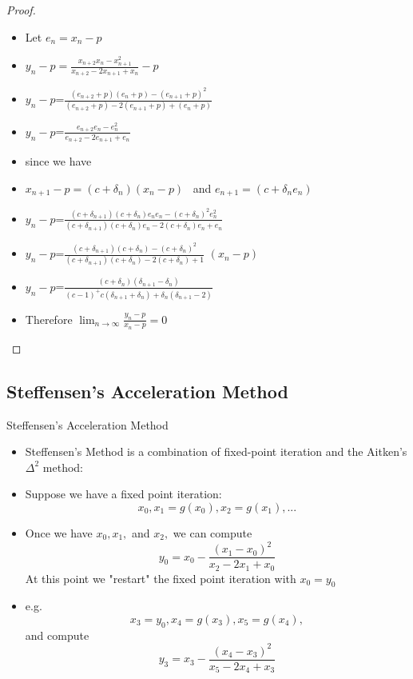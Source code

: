 \documentclass{beamer}
\begin{document}
\begin{frame}
\begin{proof}
\begin{itemize}
	\item[]<1-> Let $e_{n} = x_{n}-p$ 
	\item[]<2-> $y_{n}-p=\frac{x_{n+2}x_{n}-x_{n+1}^2}{x_{n+2} - 2x_{n+1}+x_{n}}-p$
	\item[]<3-> $y_{n}-p$=$\frac{(e_{n+2}+p)(e_{n}+p)-(e_{n+1}+p)^2}{(e_{n+2}+p)-2(e_{n+1}+p)+(e_{n}+p)}$
	\item[]<4-> $y_{n}-p$=$\frac{e_{n+2}e_{n}-e_{n}^2}{e_{n+2}-2e_{n+1}+e_{n}}$
	\item[]<5-> since we have
	\item[]<5-> $x_{n+1}-p= (c+\delta_{n})(x_{n}-p)$ 
	\ and $e_{n+1}=(c+\delta_{n}e_{n})$
	\item[]<6-> $y_{n}-p$=$\frac{(c+\delta_{n+1})(c+\delta_{n})e_{n}e_{n}-(c+\delta_{n})^2e_{n}^2}{(c+\delta_{n+1})(c+\delta_{n})e_{n}-2(c+\delta_{n})e_{n}+e_{n}}$
	\item[]<7-> $y_{n}-p$=$\frac{(c+\delta_{n+1})(c+\delta_{n})-(c+\delta_{n})^2}{(c+\delta_{n+1})(c+\delta_{n})-2(c+\delta_{n})+1}$ $(x_{n}-p)$
	\item[]<8-> $y_{n}-p$=$\frac{(c+\delta_{n})(\delta_{n+1}-\delta_{n})}{(c-1)^+c(\delta_{n+1}+\delta_{n})+\delta_{n}(\delta_{n+1}-2)}$
	\item[]<9-> Therefore $\lim_{n\rightarrow\infty} \frac{y_{n}-p}{x_{n}-p}=0$
\end{itemize}
\end{proof}

\end{frame}
\subsection{Steffensen's Acceleration Method}
\begin{frame}
\begin{block}{Steffensen's Acceleration Method}
\begin{itemize}



\item[]<1->Steffensen’s Method is a combination of fixed-point iteration and the Aitken’s $\Delta^2$ method: 

	\item[]<2->Suppose we have a fixed point iteration: $$x_0,x_1=g(x_0),x_2=g(x_1),...$$
	\item[]<3->Once we have $x_0, x_1,$ and $x_2,$ we can compute $$ y_0=x_0-\frac{(x_1-x_0)^2}{x_2-2x_1+x_0}$$ 
At this point we "restart" the fixed point iteration with $x_0=y_0$
	\item[]<4->e.g.\color{brown} $$x_3=y_0, x_4=g(x_3), x_5=g(x_4),$$\color{black}
and compute \color{brown} $$y_3=x_3-\frac{(x_4-x_3)^2}{x_5-2x_4+x_3}$$ \color{black}

\end{itemize}

\end{block}
\end{frame}
\end{document}

